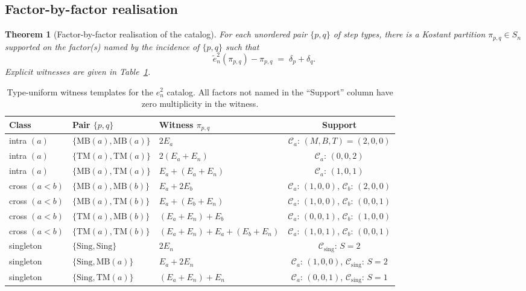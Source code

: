 \documentclass[11pt]{article}
\newtheorem{theorem}{Theorem}[section]
\theoremstyle{definition}
\theoremstyle{remark}
\newcommand{\Sing}{\mathrm{Sing}}
\newcommand{\MB}{\mathrm{MB}}
\newcommand{\TM}{\mathrm{TM}}
\newcommand{\Cmid}{\mathcal{C}}
\newcommand{\Csing}{\mathcal{C}_{\mathrm{sing}}}
\begin{document}
\subsection{Factor-by-factor realisation}\label{ssec:factor-by-factor}

\begin{theorem}[Factor-by-factor realisation of the catalog]\label{thm:phaseC-realisation}
For each unordered pair $\{p, q\}$ of step types, there is a Kostant partition
$\pi_{p,q} \in S_n$ supported on the factor(s) named by the incidence of $\{p, q\}$
such that
\[
\tilde e_n^2(\pi_{p,q}) - \pi_{p,q} \;=\; \delta_p + \delta_q.
\]
Explicit witnesses are given in Table~\ref{tab:witness-table}.
\end{theorem}

\begin{table}[ht]
\centering
\begin{tabular}{lllc}
\hline
Class & Pair $\{p,q\}$ & Witness $\pi_{p,q}$ & Support \\
\hline
intra $(a)$ & $\{\MB(a), \MB(a)\}$ & $2 E_a$ & $\Cmid_a$: $(M, B, T) = (2, 0, 0)$ \\
intra $(a)$ & $\{\TM(a), \TM(a)\}$ & $2(E_a + E_n)$ & $\Cmid_a$: $(0, 0, 2)$ \\
intra $(a)$ & $\{\MB(a), \TM(a)\}$ & $E_a + (E_a + E_n)$ & $\Cmid_a$: $(1, 0, 1)$ \\
cross $(a < b)$ & $\{\MB(a), \MB(b)\}$ & $E_a + 2 E_b$ & $\Cmid_a$: $(1,0,0)$, $\Cmid_b$: $(2,0,0)$ \\
cross $(a < b)$ & $\{\MB(a), \TM(b)\}$ & $E_a + (E_b + E_n)$ & $\Cmid_a$: $(1,0,0)$, $\Cmid_b$: $(0,0,1)$ \\
cross $(a < b)$ & $\{\TM(a), \MB(b)\}$ & $(E_a + E_n) + E_b$ & $\Cmid_a$: $(0,0,1)$, $\Cmid_b$: $(1,0,0)$ \\
cross $(a < b)$ & $\{\TM(a), \TM(b)\}$ & $(E_a + E_n) + E_a + (E_b + E_n)$ & $\Cmid_a$: $(1,0,1)$, $\Cmid_b$: $(0,0,1)$ \\
singleton & $\{\Sing, \Sing\}$ & $2 E_n$ & $\Csing$: $S = 2$ \\
singleton & $\{\Sing, \MB(a)\}$ & $E_a + 2 E_n$ & $\Cmid_a$: $(1,0,0)$, $\Csing$: $S = 2$ \\
singleton & $\{\Sing, \TM(a)\}$ & $(E_a + E_n) + E_n$ & $\Cmid_a$: $(0,0,1)$, $\Csing$: $S = 1$ \\
\hline
\end{tabular}
\caption{Type-uniform witness templates for the $e_n^2$ catalog. All factors not
named in the ``Support'' column have zero multiplicity in the witness.}
\label{tab:witness-table}
\end{table}
\end{document}
